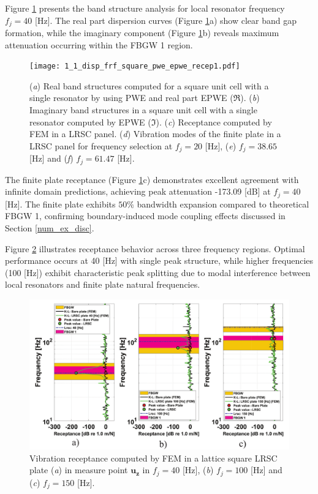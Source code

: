 \documentclass[review,numbers,sort&compress]{elsarticle}
\begin{document}
Figure \ref{lat_s_pwe_epwe_tr_frf} presents the band structure analysis for local resonator frequency $f_j = 40$ [Hz]. The real part dispersion curves (Figure \ref{lat_s_pwe_epwe_tr_frf}a) show clear band gap formation, while the imaginary component (Figure \ref{lat_s_pwe_epwe_tr_frf}b) reveals maximum attenuation occurring within the FBGW 1 region.
\newpage
\begin{figure}[htb]
	\centering
	\texttt{[image: 1\_1\_disp\_frf\_square\_pwe\_epwe\_recep1.pdf]}
	\caption{(\textit{a}) Real band structures computed for a square unit cell with a single resonator by using PWE and real part EPWE ($\Re$). (\textit{b}) Imaginary band structures in a square unit cell with a single resonator computed by EPWE ($\Im$). (\textit{c}) Receptance computed by FEM in a LRSC panel. (\textit{d}) Vibration modes of the finite plate in a LRSC panel for frequency selection at $f_j = 20$ [Hz], (\textit{e}) $f_j = 38.65$ [Hz] and (\textit{f}) $f_j = 61.47$ [Hz].}
	\label{lat_s_pwe_epwe_tr_frf}
\end{figure}

The finite plate receptance (Figure \ref{lat_s_pwe_epwe_tr_frf}c) demonstrates excellent agreement with infinite domain predictions, achieving peak attenuation -173.09 [dB] at $f_j = 40$ [Hz]. The finite plate exhibits $50\%$ bandwidth expansion compared to theoretical FBGW 1, confirming boundary-induced mode coupling effects discussed in Section \ref{num_ex_disc}.

Figure \ref{lat_s_tr_frf_f1_f2_f3} illustrates receptance behavior across three frequency regions. Optimal performance occurs at 40 [Hz] with single peak structure, while higher frequencies (100 [Hz]) exhibit characteristic peak splitting due to modal interference between local resonators and finite plate natural frequencies.
\newpage
\begin{figure}[htb]
	\centering
	\includegraphics[width=1.0\textwidth]{2_1_disp_frf_square_3_receps.pdf}
	\caption{Vibration receptance computed by FEM in a lattice square LRSC plate (\textit{a}) in measure point  $\mathbf{u_z}$ in $f_j = 40$ [Hz], (\textit{b}) $f_j = 100$ [Hz] and (\textit{c}) $f_j = 150$ [Hz].}
	\label{lat_s_tr_frf_f1_f2_f3}
\end{figure}
\end{document}
